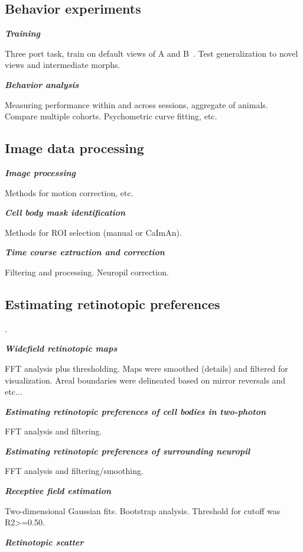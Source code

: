\documentclass{article}
\begin{document}
\subsection{Behavior experiments}
\textbf{\textit{Training}}

Three port task, train on default views of A and B~\cite{Zoccolan2009}. Test generalization to novel views and intermediate morphs. 

\textbf{\textit{Behavior analysis}}

Measuring performance within and across sessions, aggregate of animals. Compare multiple cohorts.
Psychometric curve fitting, etc.

\subsection{Image data processing}
\textbf{\textit{Image processing}}

Methods for motion correction, etc.

\textbf{\textit{Cell body mask identification}}

Methods for ROI selection (manual or CaImAn).

\textbf{\textit{Time course extraction and correction}}

Filtering and processing. Neuropil correction.

\subsection{Estimating retinotopic preferences}. 

\textbf{\textit{Widefield retinotopic maps}}

FFT analysis plus thresholding. Maps were smoothed (details) and filtered for visualization. Areal boundaries were delineated based on mirror reversals and etc...

\textbf{\textit{Estimating retinotopic preferences of cell bodies in two-photon}}

FFT analysis and filtering.


\textbf{\textit{Estimating retinotopic preferences of surrounding neuropil}}

FFT analysis and filtering/smoothing.

\textbf{\textit{Receptive field estimation}}

Two-dimensional Gaussian fits.  Bootstrap analysis. 
Threshold for cutoff was R2>=0.50.

\textbf{\textit{Retinotopic scatter}}
\end{document}
